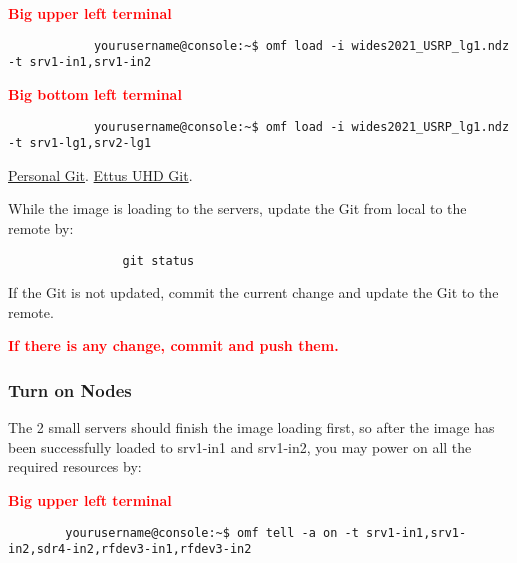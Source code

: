 \documentclass{article}
\begin{document}
            \textbf{\textcolor{red}{Big upper left terminal}}
            
            \begin{verbatim}
            yourusername@console:~$ omf load -i wides2021_USRP_lg1.ndz -t srv1-in1,srv1-in2
            \end{verbatim}
            
            \textbf{\textcolor{red}{Big bottom left terminal}}
            
            \begin{verbatim}
            yourusername@console:~$ omf load -i wides2021_USRP_lg1.ndz -t srv1-lg1,srv2-lg1
            \end{verbatim}
            
            
            
            \href{https://github.com/BrianZ96/COSMOS_USRP}{Personal Git}.
            \href{https://github.com/EttusResearch/uhd}{Ettus UHD Git}. 
            
            While the image is loading to the servers, update the Git from local to the remote by:
            \begin{verbatim}
                git status
            \end{verbatim}
            If the Git is not updated, commit the current change and update the Git to the remote. 
            
            \textbf{\textcolor{red}{If there is any change, commit and push them. }}
            
            \subsubsection{Turn on Nodes}
            The 2 small servers should finish the image loading first, so after the image has been successfully loaded to srv1-in1 and srv1-in2, you may power on all the required resources by:
            
            \textbf{\textcolor{red}{Big upper left terminal}}
            
            \begin{verbatim}
        yourusername@console:~$ omf tell -a on -t srv1-in1,srv1-in2,sdr4-in2,rfdev3-in1,rfdev3-in2
            \end{verbatim}
            
\end{document}
